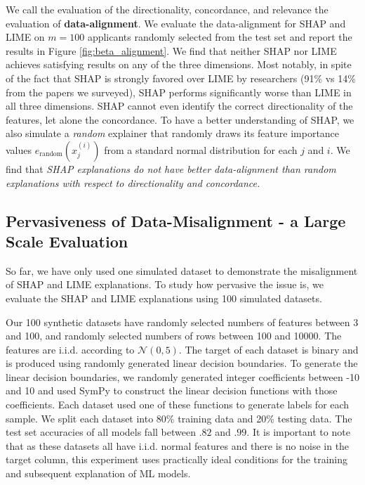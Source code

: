 \documentclass[12pt]{article}  %
\begin{document}
  We call the evaluation of the directionality, concordance, and relevance the evaluation of \textbf{data-alignment}. We evaluate the data-alignment
 for SHAP and LIME on $m=100$ applicants randomly selected from the test set and report the results in Figure \ref{fig:beta_alignment}. 
 We find that neither SHAP nor LIME achieves satisfying results on any of the three dimensions. Most notably, in spite of the fact that SHAP is strongly favored over LIME by researchers (91\% vs 14\% from the papers we surveyed), SHAP performs significantly worse than LIME in all three dimensions. SHAP cannot even identify the correct directionality of the features, let alone the concordance. To have a better understanding of SHAP, we also simulate a \emph{random} explainer that randomly draws its feature importance values $e_\text{random}(x^{(i)}_j)$ from a standard normal distribution for each $j$ and $i$. We find that \emph{SHAP explanations do not have better data-alignment than random explanations  with respect to directionality and concordance.}         


\subsection{Pervasiveness of Data-Misalignment - a Large Scale Evaluation}
    \label{sec:pervasive}
    So far, we have only used one simulated dataset to demonstrate the misalignment of SHAP and LIME explanations. To study how pervasive the issue is, %
    we evaluate the SHAP and LIME explanations using 100 simulated datasets.
    
    Our 100 synthetic datasets have randomly selected numbers of features between 3 and 100, and randomly selected numbers of rows between 100 and 10000. The features are i.i.d. according to $\mathcal{N}(0,5)$. The target of each dataset is binary and is produced using randomly generated linear decision boundaries. To generate the linear decision boundaries, we randomly generated integer coefficients between -10 and 10 and used SymPy to construct the linear decision functions with those coefficients. Each dataset used one of these functions to generate labels for each sample.  %
    We split each dataset into 80\% training data and 20\% testing data.  The test set accuracies of all models fall between $.82$ and $.99$. It is important to note that as these datasets all have i.i.d. normal features and there is no noise in the target column, this experiment uses practically ideal conditions for the training and subsequent explanation of ML models.
\end{document}
